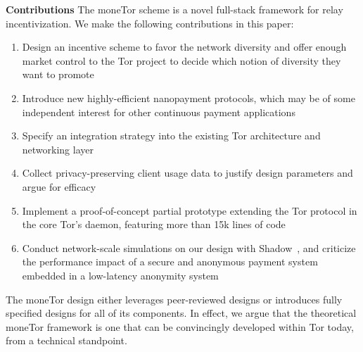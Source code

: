 \textbf{Contributions} The moneTor scheme is a novel full-stack framework for
relay incentivization. We make the following contributions in this paper:

\begin{enumerate}
\item Design an incentive scheme to favor the network diversity and offer enough market control to the Tor project to decide which notion of diversity they want to promote
\item Introduce new highly-efficient nanopayment protocols, which may be of some
  independent interest for other continuous payment applications
\item Specify an integration strategy into the existing Tor architecture and networking layer
\item Collect privacy-preserving client usage data to justify design parameters
  and argue for efficacy
\item Implement a proof-of-concept partial prototype extending the Tor protocol in the core Tor's daemon, featuring more than 15k lines of code
\item Conduct network-scale simulations on our design with Shadow~\cite{jansen2011shadow}, and criticize the performance impact of a secure and anonymous payment system embedded in a low-latency anonymity system
\end{enumerate}

The moneTor design either leverages peer-reviewed designs or introduces fully
specified designs for all of its components. In effect, we argue that the
theoretical moneTor framework is one that can be convincingly developed within
Tor today, from a technical standpoint.